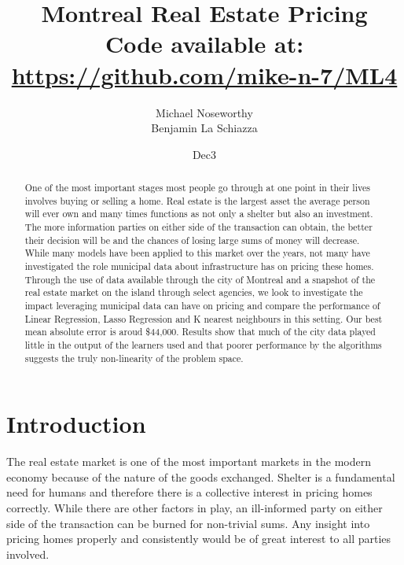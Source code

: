 \documentclass{acm_proc_article-sp}
\begin{document}
\title{Montreal Real Estate Pricing \\
{\normalsize Code available at: \url{https://github.com/mike-n-7/ML4}}} 
\subtitle{}

\author{
\alignauthor 
Michael Noseworthy \\
\alignauthor Benjamin La Schiazza\\
}

\date{Dec3}

\maketitle
\begin{abstract}
	One of the most important stages most people go through at one point in their lives involves buying or selling a home.  Real estate is the largest asset the average person will ever own and many times functions as not only a shelter but also an investment. The more information parties on either side of the transaction can obtain, the better their decision will be and the chances of losing large sums of money will decrease. While many models have been applied to this market over the years, not many have investigated the role municipal data about infrastructure has on pricing these homes. Through the use of data available through the city of Montreal and a snapshot of the real estate market on the island through select agencies, we look to investigate the impact leveraging municipal data can have on pricing and compare the performance of Linear Regression, Lasso Regression and K nearest neighbours in this setting. Our best mean absolute error is aroud \$44,000. Results show that much of the city data played little in the output of the learners used and that poorer performance by the algorithms suggests the truly non-linearity of the problem space.

\end{abstract}

\section{Introduction}

	The real estate market is one of the most important markets in the modern economy because of the nature of the goods exchanged. Shelter is a fundamental need for humans and therefore there is a collective interest in pricing homes correctly. While there are other factors in play, an ill-informed party on either side of the transaction can be burned for non-trivial sums. Any insight into pricing homes properly and consistently would be of great interest to all parties involved. 
	
\end{document}
